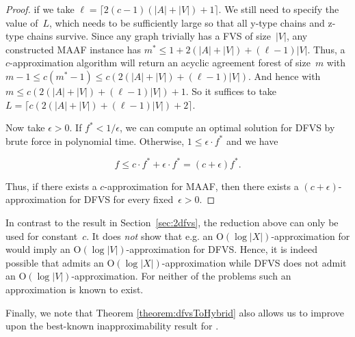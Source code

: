 \begin{proof}
if we take $\ell = \lceil2(c-1)(|A|+|V|)+1\rceil$. We still need to specify the value of~$L$, which needs to be sufficiently large so that all y-type chains and z-type chains survive. Since any graph trivially has a FVS of size~$|V|$, any constructed {\sc MAAF} instance has $m^*\leq 1+2(|A|+|V|)+(\ell-1)|V|$. Thus, a $c$-approximation algorithm will return an acyclic agreement forest of size~$m$ with $m-1\leq c(m^*-1) \leq c(2(|A|+|V|)+(\ell-1)|V|)$. And hence with~$m\leq c(2(|A|+|V|)+(\ell-1)|V|)+1$. So it suffices to take $L = \lceil c(2(|A|+|V|)+(\ell-1)|V|) + 2\rceil$.

Now take $\epsilon > 0$. If $f^*<1 / \epsilon$, we can compute an optimal solution for {\sc DFVS} by brute force in polynomial time. Otherwise, $1 \leq  \epsilon\cdot f^*$ and we have

\[
f \leq c\cdot f^* + \epsilon\cdot f^* = (c+\epsilon)f^*.
\]

Thus, if there exists a $c$-approximation for MAAF, then there exists a $(c+\epsilon)$-approximation for DFVS for every fixed~$\epsilon > 0$.

\end{proof}

In contrast to the result in Section~\ref{sec:2dfvs}, the reduction above can only be used for constant~$c$. It does \emph{not} show that e.g. an $\text{O}(\log |X|)$-approximation for \mh would imply an $\text{O}(\log |V|)$-approximation for {\sc DFVS}. Hence, it is indeed possible that \mh admits an $\text{O}(\log |X|)$-approximation while {\sc DFVS} does not admit an $\text{O}(\log |V|)$-approximation. For neither of the problems such an approximation is known to exist.

Finally, we note that Theorem \ref{theorem:dfvsToHybrid} also allows
us to improve upon the best-known inapproximability result for \mh.

